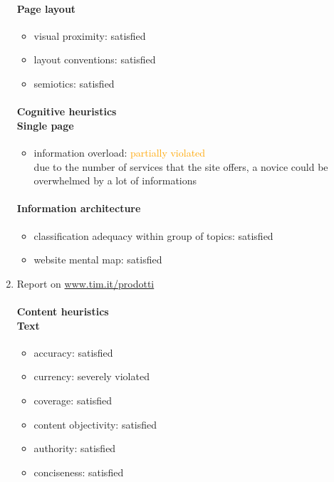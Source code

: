 \begin{enumerate}
	\paragraph*{Page layout}
	\begin{itemize}
		\item visual proximity: satisfied
		\item layout conventions: satisfied
		\item semiotics: satisfied
	\end{itemize}	
	
	\paragraph*{Cognitive heuristics \\ Single page}
	\begin{itemize}
		\item information overload: \textcolor{orange}{partially violated}\\
		due to the number of services that the site offers, a novice could be overwhelmed by a lot of informations
	\end{itemize}	
	
	\paragraph*{Information architecture}
	\begin{itemize}
		\item classification adequacy within group of topics: satisfied
		\item website mental map: satisfied
	\end{itemize}


\item Report on \url{www.tim.it/prodotti}
	\paragraph*{Content heuristics \\ Text}
	\begin{itemize}
		\item accuracy: satisfied
		\item currency: severely violated
		\item coverage: satisfied
		\item content objectivity: satisfied
		\item authority: satisfied
		\item conciseness: satisfied		
	\end{itemize}


\end{enumerate}
